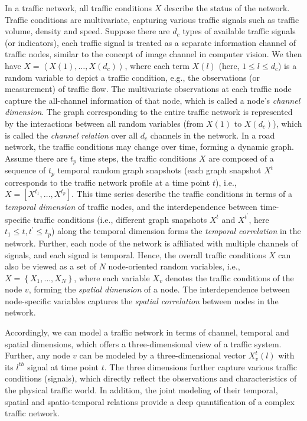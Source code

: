 In a traffic network, all traffic conditions $X$ describe the status of the network. Traffic conditions are multivariate, capturing various traffic signals such as traffic volume, density and speed. Suppose there are $d_c$ types of available traffic signals (or indicators), each traffic signal is treated as a separate information channel of traffic nodes, similar to the concept of image channel in computer vision. We then have $X=\left < X(1),\dots,X(d_c) \right >$, where each term $X(l)$ (here, $1 \leq l \leq d_c$) is a random variable to depict a traffic condition, e.g., the observations (or measurement) of traffic flow. The multivariate observations at each traffic node capture the all-channel information of that node, which is called a node’s \textit{channel dimension}. The graph corresponding to the entire traffic network is represented by the interactions between all random variables (from $X(1)$ to $X(d_c)$), which is called the \textit{channel relation} over all $d_c$ channels in the network. 
In a road network, the traffic conditions may change over time, forming a dynamic graph. Assume there are $t_p$ time steps, the traffic conditions $X$ are composed of a sequence of $t_p$ temporal random graph snapshots (each graph snapshot $X^{t}$ corresponds to the traffic network profile at a time point $t$), i.e., $X = [X^{t_1}, \dots , X^{t_p}]$. This time series describe the traffic conditions in terms of a \textit{temporal dimension} of traffic nodes, and the interdependence between time-specific traffic conditions (i.e., different graph snapshots $X^t$ and $X^{t^{'}}$, here $t_1 \leq t, t^{'} \leq t_p$) along the temporal dimension forms the \textit{temporal correlation}  in the network. 
Further, each node of the network is affiliated with multiple channels of signals, and each signal is temporal. Hence, the overall traffic conditions $X$ can also be viewed as a set of $N$ node-oriented random variables, i.e., $X = \left\{X_1, \dots , X_N\right\}$, where each variable $X_v$ denotes the traffic conditions of the node $v$, forming the \textit{spatial dimension} of a node. The interdependence between node-specific variables captures the \textit{spatial correlation} between nodes in the network.  

Accordingly, we can model a traffic network in terms of channel, temporal and spatial dimensions, which offers a three-dimensional view of a traffic system. Further, any node $v$ can be modeled by a three-dimensional vector $X_v^{t}(l)$ with its $l^{th}$ signal at time point $t$. The three dimensions further capture various traffic conditions (signals), which directly reflect the observations and characteristics of the physical traffic world. In addition, the joint modeling of their temporal, spatial and spatio-temporal relations provide a deep quantification of a complex traffic network. 

